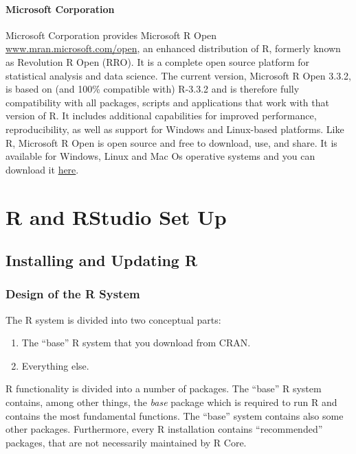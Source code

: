 \documentclass[]{book}
\providecommand{\tightlist}{%
  \setlength{\itemsep}{0pt}\setlength{\parskip}{0pt}}
\def\tightlist{}
\begin{document}
\subsubsection{Microsoft Corporation}\label{microsoft-corporation}

Microsoft Corporation provides Microsoft R Open
\href{https://mran.microsoft.com/open/}{www.mran.microsoft.com/open}, an
enhanced distribution of R, formerly known as Revolution R Open (RRO).
It is a complete open source platform for statistical analysis and data
science. The current version, Microsoft R Open 3.3.2, is based on (and
100\% compatible with) R-3.3.2 and is therefore fully compatibility with
all packages, scripts and applications that work with that version of R.
It includes additional capabilities for improved performance,
reproducibility, as well as support for Windows and Linux-based
platforms. Like R, Microsoft R Open is open source and free to download,
use, and share. It is available for Windows, Linux and Mac Os operative
systems and you can download it
\href{https://mran.microsoft.com/download/}{here}.

\chapter{R and RStudio Set Up}\label{r-and-rstudio-set-up}

\section{Installing and Updating R}\label{installing-and-updating-r}

\subsection{Design of the R System}\label{design-of-the-r-system}

The R system is divided into two conceptual parts:

\begin{enumerate}
\def\labelenumi{\arabic{enumi}.}
\tightlist
\item
  The ``base'' R system that you download from CRAN.
\item
  Everything else.
\end{enumerate}

R functionality is divided into a number of packages. The ``base'' R
system contains, among other things, the \emph{base} package which is
required to run R and contains the most fundamental functions. The
``base'' system contains also some other packages. Furthermore, every R
installation contains ``recommended'' packages, that are not necessarily
maintained by R Core.
\end{document}
